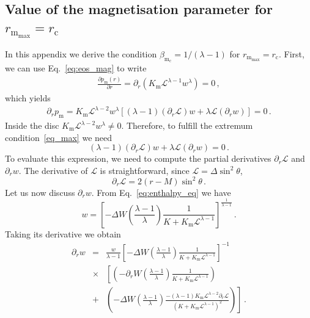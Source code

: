 \documentclass[referee]{aa}
\begin{document}
\begin{appendix}
\section{Value of the magnetisation parameter for $r_{\mathrm{m}_{\mathrm{max}}} = r_{\mathrm{c}}$}\label{app_magmax}
In this appendix we derive the condition $\beta_{\mathrm{m}_{\mathrm{c}}} = 1/(\lambda - 1)$ for $r_{\mathrm{m}_{\mathrm{max}}} = r_{\mathrm{c}}$.
First, we can use Eq.~\eqref{eq:eos_mag} to write 
\begin{eqnarray}\label{eq_max}
\frac{\partial{p_{\mathrm{m}}(r)}}{\partial r} = \partial_{r} \left(K_{\mathrm{m}} \mathcal{L}^{\lambda -1} w^{\lambda}\right) = 0\,,
\end{eqnarray}
which yields
\begin{eqnarray}
\partial_{r} p_{\mathrm{m}} = K_{\mathrm{m}} \mathcal{L}^{\lambda - 2}w^{\lambda} [(\lambda - 1)(\partial_r \mathcal{L}) w + \lambda \mathcal{L} (\partial_r w)]=0\,.
\end{eqnarray}
Inside the disc $K_{\mathrm{m}} \mathcal{L}^{\lambda - 2}w^{\lambda} \neq 0$. Therefore, to fulfill the extremum condition~\eqref{eq_max} we need 
\begin{equation}\label{eq:simple_expr}
(\lambda - 1)(\partial_r \mathcal{L}) w + \lambda \mathcal{L} (\partial_r w) = 0\,.
\end{equation}
To evaluate this expression, we need to compute the partial derivatives $\partial_r \mathcal{L}$ and $\partial_r w$. The derivative of $\mathcal{L}$ is straightforward, since $\mathcal{L} = \Delta \sin^2 \theta$,
\begin{equation}
\partial_r \mathcal{L} = 2(r-M)\sin^2 \theta\,.
\end{equation}
Let us now discuss $\partial_r w$. From Eq.~\eqref{eq:enthalpy_eq} we have
\begin{equation}
w = \left[-\Delta W \left(\frac{\lambda -1}{\lambda}\right)\frac{1}{K+K_{\mathrm{m}}\mathcal{L}^{\lambda - 1}}\right]^{\frac{1}{\lambda-1}}\,.
\end{equation}
Taking its derivative we obtain
\begin{eqnarray}
\partial_r w &=& \frac{w}{\lambda - 1} \left[-\Delta W \left(\frac{\lambda -1}{\lambda}\right)\frac{1}{K+K_{\mathrm{m}}\mathcal{L}^{\lambda - 1}}\right]^{-1} 
\nonumber \\
&\times&
\left[\left(-\partial_r W \left(\frac{\lambda -1 }{\lambda}\right) \frac{1}{K+K_{\mathrm{m}}\mathcal{L}^{\lambda - 1}}\right) 
\right.
\nonumber \\
&+& \left. \left(-\Delta W \left(\frac{\lambda -1}{\lambda}\right)\frac{-(\lambda - 1) K_{\mathrm{m}} \mathcal{L}^{\lambda - 2} \partial_r \mathcal{L}}{(K+K_{\mathrm{m}}\mathcal{L}^{\lambda - 1})^2}\right)\right]\,.

\end{eqnarray}
\end{appendix}
\end{document}
